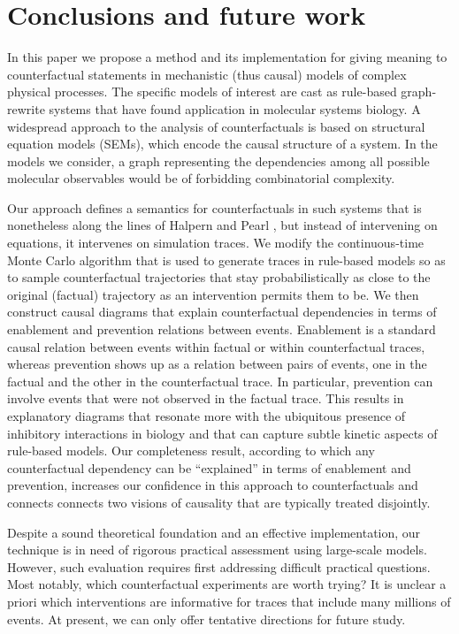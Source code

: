 
\section*{Conclusions and future work}

In this paper we propose a method and its implementation for giving meaning to
counterfactual statements in mechanistic (thus causal) models of complex
physical processes. The specific models of interest are cast as rule-based
graph-rewrite systems that have found application in molecular systems biology.
A widespread approach to the analysis of counterfactuals is based on structural
equation models (SEMs), which encode the causal structure of a system. In the
models we consider, a graph representing the dependencies among all possible
molecular observables would be of forbidding combinatorial complexity.

Our approach defines a semantics for counterfactuals in such systems that is
nonetheless along the lines of Halpern and Pearl
\cite{pearl2009causality,halpern2016actual}, but instead of intervening on
equations, it intervenes on simulation traces. We modify the continuous-time
Monte Carlo algorithm that is used to generate traces in rule-based models so as
to sample counterfactual trajectories that stay probabilistically as close to
the original (factual) trajectory as an intervention permits them to be. We then
construct causal diagrams that explain counterfactual dependencies in terms of
enablement and prevention relations between events. Enablement is a standard
causal relation between events within factual or within counterfactual traces,
whereas prevention shows up as a relation between pairs of events, one in the
factual and the other in the counterfactual trace. In particular, prevention can
involve events that were not observed in the factual trace. This results in
explanatory diagrams that resonate more with the ubiquitous presence of
inhibitory interactions in biology and that can capture subtle kinetic aspects
of rule-based models.  Our completeness result, according to which any
counterfactual dependency can be ``explained'' in terms of enablement and
prevention, increases our confidence in this approach to counterfactuals and
connects connects two visions of causality that are typically treated
disjointly.

Despite a sound theoretical foundation and an effective implementation, our technique is in need of rigorous practical assessment using large-scale
models. However, such evaluation requires first addressing difficult practical
questions. Most notably, which counterfactual experiments are worth trying? It
is unclear a priori which interventions are informative for traces that
include many millions of events. At present, we can only offer tentative
directions for future study.

